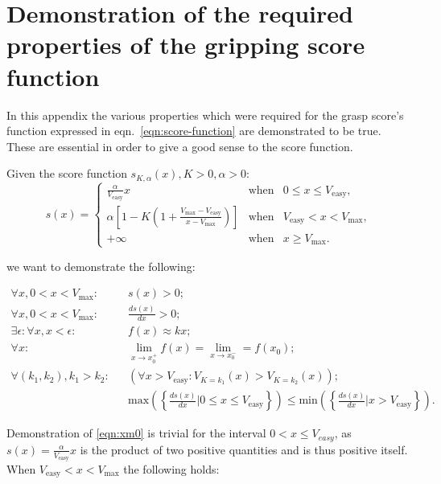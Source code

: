 \appendix
\chapter{Demonstration of the required properties of the gripping score function} \label{sec:demonstrate-score}
In this appendix the various properties which were required for the
grasp score's function expressed in eqn.~\ref{eqn:score-function} are
demonstrated to be true. These are essential in order to give a good sense to the score function.

Given the score function $s_{K,\alpha}(x), K>0, \alpha>0$:
\begin{equation} 
  s(x)=\left\{
    \begin{array}{lcr}
      \frac{\alpha}{V_{\text{easy}}} x & \text{when} & 0 \leq x \leq V_{\text{easy}}, \\
      \alpha
      \left[1-K\left(1+\frac{V_{\text{max}}-V_{\text{easy}}}{x-V_{\text{max}}}\right)\right]
      & \text{when} &  V_{\text{easy}} < x < V_{\text{max}}, \\
      +\infty & \text{when} & x \geq V_{\text{max}}.
    \end{array}
  \right.
\end{equation}

we want to demonstrate the following:

\begin{eqnarray}
\forall x, 0 < x < V_{\text{max}} : && s(x) > 0; \label{eqn:xm0}\\
\forall x, 0 < x < V_{\text{max}} : && \frac{ds(x)}{dx} > 0; \label{eqn:dxm0}\\
\exists \epsilon : \forall x, x < \epsilon : && f(x) \approx kx; \label{eqn:fxekx} \\
\forall x : && \lim_{x\rightarrow x_0^+} f(x) =\lim_{x\rightarrow x_0^-}= f(x_0); \label{eqn:fxcont}\\
\forall (k_1,k_2), k_1 > k_2 : && \left( \forall x > V_{\text{easy}} : V_{K=k_1}(x) > V_{K=k_2}(x) \right); \label{eqn:kgrows}\\
 && \text{max}\left( \left\{ \frac{ds(x)}{dx} | 0 \leq
    x \leq V_{\text{easy}} \right\} \right) \leq \text{min}\left( \left\{
  \frac{ds(x)}{dx} | x > V_{\text{easy}}\right\} \right). \label{eqn:kreallygrows}
\end{eqnarray}

Demonstration of \ref{eqn:xm0} is trivial for the interval $0 < x \leq
V_{easy}$, as $s(x)=\frac{\alpha}{V_{\text{easy}}} x$ is the product of two positive
quantities and is thus positive itself. When $V_{\text{easy}} < x <
V_{\text{max}}$ the following holds:

